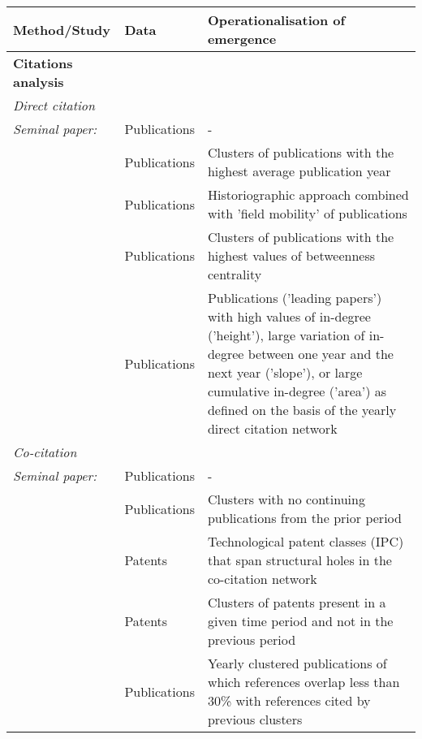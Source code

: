 \documentclass[11pt]{article}
\begin{document}
{\begin{landscape}
\begin{spacing}{0.8}
\begin{longtable}{p{6cm}p{2.7cm}p{13cm}}
\newpage
\textbf{Method/Study}&			\textbf{Data}&			\textbf{Operationalisation of emergence}\\
\hline
\textbf{Citations analysis}\\
\textit{Direct citation}\\
\addtolength{\leftskip}{1em}\noindent		\textit{Seminal paper:} \cite{Garfield1964}&  	Publications&   - \\ [1ex]
\addtolength{\leftskip}{1em}\noindent		\cite{Kajikawa2008,Kajikawa2008a,Takeda2008}&  		Publications&  	Clusters of publications with the highest average publication year\\ [1ex]
\addtolength{\leftskip}{1em}\noindent		\cite{Scharnhorst2010}&  		Publications&   Historiographic approach combined with 'field mobility' of publications\\ [1ex]
\addtolength{\leftskip}{1em}\noindent		\cite{Shibata2011}&  			Publications&  	Clusters of publications with the highest values of betweenness centrality\\ [1ex]
\addtolength{\leftskip}{1em}\noindent		\cite{Iwami2014}&  		Publications&  	Publications ('leading papers') with high values of in-degree ('height'), large variation of in-degree between one year and the next year ('slope'), or large cumulative in-degree ('area') as defined on the basis of the yearly direct citation network\\ [1ex]


\textit{Co-citation}\\
\addtolength{\leftskip}{1em}\noindent		\textit{Seminal paper:} \cite{Small1973}&  	Publications&  		-\\ [1ex]
\addtolength{\leftskip}{1em}\noindent		\cite{Small2006}&			Publications&			Clusters with no continuing publications from the prior period\\ [1ex]
\addtolength{\leftskip}{1em}\noindent		\cite{Cho2011}&  			Patents&  				Technological patent classes (IPC) that span structural holes in the co-citation network\\ [1ex]
\addtolength{\leftskip}{1em}\noindent		\cite{Erdi2012}& 			Patents&  				Clusters of patents present in a given time period and not in the previous period\\ [1ex]
\addtolength{\leftskip}{1em}\noindent		\cite{Boyack2014}& 			Publications&  			Yearly clustered publications of which references overlap less than 30\%  with references cited by previous clusters\\ [1ex]


\end{longtable}
\end{spacing}
\end{landscape}}
\end{document}
